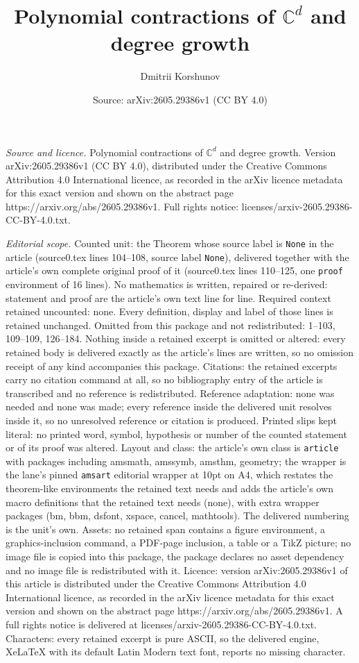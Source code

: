 \documentclass[10pt,a4paper]{amsart}
\title[Polynomial contractions of $\mathbb C^d$ and degree growth]{Polynomial contractions of $\mathbb C^d$ and degree growth}
\author{Dmitrii Korshunov}
\date{Source: arXiv:2605.29386v1 (CC BY 4.0)}
\begin{document}
\maketitle

\noindent\emph{Source and licence.} Polynomial contractions of $\mathbb C^d$ and degree growth. Version arXiv:2605.29386v1 (CC BY 4.0), distributed under the Creative Commons Attribution 4.0 International licence, as recorded in the arXiv licence metadata for this exact version and shown on the abstract page https://arxiv.org/abs/2605.29386v1. Full rights notice: licenses/arxiv-2605.29386-CC-BY-4.0.txt.\par\smallskip

\noindent\textit{Editorial scope.} Counted unit: the Theorem whose source label is \texttt{None} in the article (source0.tex lines 104--108, source label \texttt{None}), delivered together with the article's own complete original proof of it (source0.tex lines 110--125, one \texttt{proof} environment of 16 lines). No mathematics is written, repaired or re-derived: statement and proof are the article's own text line for line. Required context retained uncounted: none. Every definition, display and label of those lines is retained unchanged. Omitted from this package and not redistributed: 1--103, 109--109, 126--184. Nothing inside a retained excerpt is omitted or altered: every retained body is delivered exactly as the article's lines are written, so no omission receipt of any kind accompanies this package. Citations: the retained excerpts carry no citation command at all, so no bibliography entry of the article is transcribed and no reference is redistributed. Reference adaptation: none was needed and none was made; every reference inside the delivered unit resolves inside it, so no unresolved reference or citation is produced. Printed slips kept literal: no printed word, symbol, hypothesis or number of the counted statement or of its proof was altered. Layout and class: the article's own class is \texttt{article} with packages including amsmath, amssymb, amsthm, geometry; the wrapper is the lane's pinned \texttt{amsart} editorial wrapper at 10pt on A4, which restates the theorem-like environments the retained text needs and adds the article's own macro definitions that the retained text needs (none), with extra wrapper packages (bm, bbm, dsfont, xspace, cancel, mathtools). The delivered numbering is the unit's own. Assets: no retained span contains a figure environment, a graphics-inclusion command, a PDF-page inclusion, a table or a TikZ picture; no image file is copied into this package, the package declares no asset dependency and no image file is redistributed with it. Licence: version arXiv:2605.29386v1 of this article is distributed under the Creative Commons Attribution 4.0 International licence, as recorded in the arXiv licence metadata for this exact version and shown on the abstract page https://arxiv.org/abs/2605.29386v1. A full rights notice is delivered at licenses/arxiv-2605.29386-CC-BY-4.0.txt. Characters: every retained excerpt is pure ASCII, so the delivered engine, XeLaTeX with its default Latin Modern text font, reports no missing character.
\end{document}
